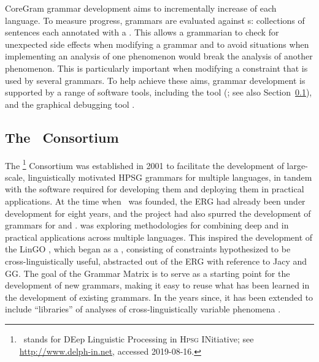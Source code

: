 \documentclass[output=paper
 	        ,biblatex
                ,babelshorthands
                ,newtxmath
                ,draftmode
                ,colorlinks, citecolor=brown
]{langscibook}
\begin{document}
CoreGram grammar development aims to incrementally increase  of each language.  To
measure progress, grammars are evaluated against s: collections of sentences each
annotated with a  \citep{ONK97a,Mueller2004f}.  This allows a
grammarian to check for unexpected side effects when modifying a grammar and to avoid situations
when implementing an analysis of one phenomenon would break the analysis of another phenomenon.
This is particularly important when modifying a constraint that is used by several grammars.  To
help achieve these aims, grammar development is supported by a range of software tools, including
the  tool \itsdb (\citealp{Oepen:01}; see also Section~\ref{cl:delphin}),
and the graphical debugging tool  \citep{DER2010a-u,DER2013a}.

\subsection{The \delphin\ Consortium}
\label{cl:delphin}

%
The \delphin\footnote{\delphin\ stands for DEep Linguistic Processing in \textsc{Hpsg} INitiative;
  see \url{http://www.delph-in.net}, accessed 2019-08-16.} Consortium was established in 2001 to
facilitate the development of large-scale, linguistically motivated HPSG grammars for multiple
languages, in tandem with the software required for developing them and deploying them in practical
applications. At the time when \delphin\ was founded, the ERG \citep{Flickinger2000a,Flickinger2011a-u} had already been under development
for eight years, and the \verbmobil project \citep{Wahlster2000a-ed} had also spurred the
development of grammars for  \citep[GG;][]{MK2000a,Crysmann2003b} and
 \citep*[Jacy;][]{SBB2016a}. 
\citep*{Callmeier-etal:2004} was exploring methodologies for combining deep and
 in practical applications across multiple languages. This inspired
the development of the LinGO  \citep*{BFO2002a-u}, which began as a , consisting of constraints hypothesized to be cross-linguistically useful, abstracted out
of the ERG with reference to Jacy and GG. The goal of the Grammar Matrix is to serve as a starting
point for the development of new grammars, making it easy to reuse what has been learned in the
development of existing grammars. In the years since, it has been extended to include
``libraries'' of analyses of cross-linguistically variable phenomena
\citep[e.g.,][]{Drellishak2009a-u,BDFPS2010a-u}.
\end{document}
